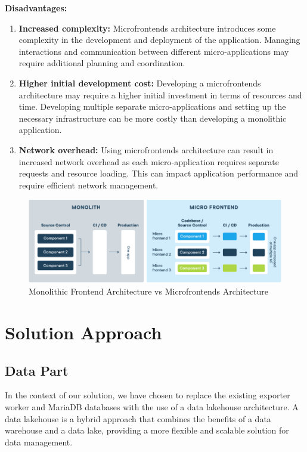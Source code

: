 \textbf{Disadvantages:}
\begin{enumerate}
\item \textbf{Increased complexity:} Microfrontends architecture introduces some complexity in the development and deployment of the application. Managing interactions and communication between different micro-applications may require additional planning and coordination.
\item \textbf{Higher initial development cost:} Developing a microfrontends architecture may require a higher initial investment in terms of resources and time. Developing multiple separate micro-applications and setting up the necessary infrastructure can be more costly than developing a monolithic application.
\item \textbf{Network overhead:} Using microfrontends architecture can result in increased network overhead as each micro-application requires separate requests and resource loading. This can impact application performance and require efficient network management.
\end{enumerate}

\begin{figure}[H]
\centering
\includegraphics[width=\linewidth]{images/micro-frontend-vs-monolith-frontend.png}
\caption{Monolithic Frontend Architecture vs Microfrontends Architecture}\label{fig:monolithfrontendvsmicrofrontends}
\end{figure}

\section{Solution Approach}
\subsection{Data Part}
In the context of our solution, we have chosen to replace the existing exporter worker and MariaDB databases with the use of a data lakehouse architecture. A data lakehouse is a hybrid approach that combines the benefits of a data warehouse and a data lake, providing a more flexible and scalable solution for data management.

